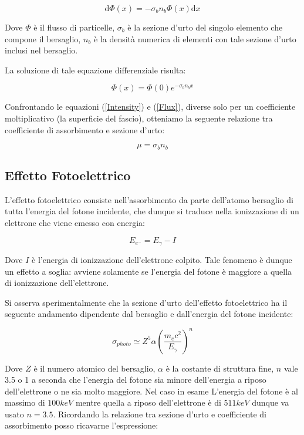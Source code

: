 \documentclass [a4paper, twoside] {book}
\begin{document}
\begin{equation}
\mathrm{d}\Phi(x)=-\sigma_{b}n_{b}\Phi(x)\mathrm{d}x
\end{equation}

Dove $\Phi$ è il flusso di particelle, $\sigma_{b}$ è la sezione d'urto del singolo elemento che compone il bersaglio, $n_b$ è la densità numerica di elementi con tale sezione d'urto inclusi nel bersaglio.

La soluzione di tale equazione differenziale risulta:

\begin{equation}
\Phi(x)=\Phi(0)e^{-\sigma_{b}n_{b}x}
\label{Flux}
\end{equation}

Confrontando le equazioni (\ref{Intensity}) e (\ref{Flux}), diverse solo per un coefficiente moltiplicativo (la superficie del fascio), otteniamo la seguente relazione tra coefficiente di assorbimento e sezione d'urto:

\begin{equation}
\mu=\sigma_{b} n_{b}
\end{equation}

\subsection{Effetto Fotoelettrico}

L'effetto fotoelettrico consiste nell'assorbimento da parte dell'atomo bersaglio di tutta l'energia del fotone incidente, che dunque si traduce nella ionizzazione di un elettrone che viene emesso con energia:

\begin{equation}
E_{e^-}=E_{\gamma}-I
\end{equation}

Dove $I$ è l'energia di ionizzazione dell'elettrone colpito. Tale fenomeno è dunque un effetto a soglia: avviene solamente se l'energia del fotone è maggiore a quella di ionizzazione dell'elettrone.

Si osserva sperimentalmente che la sezione d'urto dell'effetto fotoelettrico ha il seguente andamento dipendente dal bersaglio e dall'energia del fotone incidente:

\begin{equation}
\sigma_{photo}\simeq Z^5\alpha(\frac{m_{e}c^2}{E_{\gamma}})^n
\end{equation}

Dove $Z$ è il numero atomico del bersaglio, $\alpha$ è la costante di struttura fine, $n$ vale 3.5 o 1 a seconda che l'energia del fotone sia minore dell'energia a riposo dell'elettrone o ne sia molto maggiore. Nel caso in esame L'energia del fotone è al massimo di $100 keV$ mentre quella a riposo dell'elettrone è di $511 keV$ dunque va usato $n=3.5$.
Ricordando la relazione tra sezione d'urto e coefficiente di assorbimento posso ricavarne l'espressione:
\end{document}
